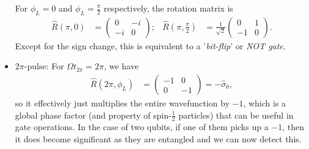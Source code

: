 \documentclass[a4paper, 11pt, normalem]{report}
\begin{document}
\begin{itemize}
        For $\phi_L=0$ and $\phi_L=\frac{\pi}{2}$ respectively, the rotation matrix is
        \begin{align}
            \hat{R}\left(\pi,0\right) &= \begin{pmatrix}0&-i\\-i&0\end{pmatrix}; & \hat{R}\left(\pi,\frac{\pi}{2}\right) &= \frac{1}{\sqrt{2}}\begin{pmatrix}0&1\\-1&0\end{pmatrix}.
        \end{align}
        Except for the sign change, this is equivalent to a '\emph{bit-flip}' or \emph{NOT gate}.
    \item $2\pi$-pulse:
        For $\Omega t_{2\pi}=2\pi$, we have
        \begin{align}
            \hat{R}\left(2\pi,\phi_L\right) &= \begin{pmatrix}-1&0\\0&-1\end{pmatrix} = -\hat{\sigma}_0,
        \end{align}
        so it effectively just multiplies the entire wavefunction by $-1$, which is a global phase factor (and property of spin-$\frac12$ particles) that can be useful in gate operations.
        In the case of two qubits, if one of them picks up a $-1$, then it does become significant as they are entangled and we can now detect this.
\end{itemize}
\end{document}
